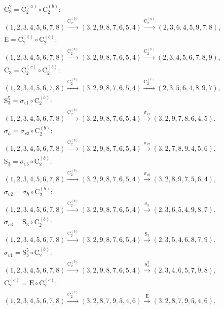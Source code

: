 \begin{align*}
& \mathrm{C}_{3}^{2} = \mathrm{C}_{2}^{(a)} \circ \mathrm{C}_{2}^{(b)}:\; \\& (1,2,3,4,5,6,7,8) \xrightarrow{\mathrm{C}_{2}^{(b)}} (3,2,9,8,7,6,5,4) \xrightarrow{\mathrm{C}_{2}^{(a)}} (2,3,6,4,5,9,7,8), \\
& \mathrm{E} = \mathrm{C}_{2}^{(b)} \circ \mathrm{C}_{2}^{(b)}:\; \\& (1,2,3,4,5,6,7,8) \xrightarrow{\mathrm{C}_{2}^{(b)}} (3,2,9,8,7,6,5,4) \xrightarrow{\mathrm{C}_{2}^{(b)}} (2,3,4,5,6,7,8,9), \\
& \mathrm{C}_{3} = \mathrm{C}_{2}^{(c)} \circ \mathrm{C}_{2}^{(b)}:\; \\& (1,2,3,4,5,6,7,8) \xrightarrow{\mathrm{C}_{2}^{(b)}} (3,2,9,8,7,6,5,4) \xrightarrow{\mathrm{C}_{2}^{(c)}} (2,3,5,6,4,8,9,7), \\
& \mathrm{S}_{3}^{5} = \sigma_{v1} \circ \mathrm{C}_{2}^{(b)}:\; \\& (1,2,3,4,5,6,7,8) \xrightarrow{\mathrm{C}_{2}^{(b)}} (3,2,9,8,7,6,5,4) \xrightarrow{\sigma_{v1}} (3,2,9,7,8,6,4,5), \\
& \sigma_{h} = \sigma_{v2} \circ \mathrm{C}_{2}^{(b)}:\; \\& (1,2,3,4,5,6,7,8) \xrightarrow{\mathrm{C}_{2}^{(b)}} (3,2,9,8,7,6,5,4) \xrightarrow{\sigma_{v2}} (3,2,7,8,9,4,5,6), \\
& \mathrm{S}_{3} = \sigma_{v3} \circ \mathrm{C}_{2}^{(b)}:\; \\& (1,2,3,4,5,6,7,8) \xrightarrow{\mathrm{C}_{2}^{(b)}} (3,2,9,8,7,6,5,4) \xrightarrow{\sigma_{v3}} (3,2,8,9,7,5,6,4), \\
& \sigma_{v2} = \sigma_{h} \circ \mathrm{C}_{2}^{(b)}:\; \\& (1,2,3,4,5,6,7,8) \xrightarrow{\mathrm{C}_{2}^{(b)}} (3,2,9,8,7,6,5,4) \xrightarrow{\sigma_{h}} (2,3,6,5,4,9,8,7), \\
& \sigma_{v3} = \mathrm{S}_{3} \circ \mathrm{C}_{2}^{(b)}:\; \\& (1,2,3,4,5,6,7,8) \xrightarrow{\mathrm{C}_{2}^{(b)}} (3,2,9,8,7,6,5,4) \xrightarrow{\mathrm{S}_{3}} (2,3,5,4,6,8,7,9), \\
& \sigma_{v1} = \mathrm{S}_{3}^{5} \circ \mathrm{C}_{2}^{(b)}:\; \\& (1,2,3,4,5,6,7,8) \xrightarrow{\mathrm{C}_{2}^{(b)}} (3,2,9,8,7,6,5,4) \xrightarrow{\mathrm{S}_{3}^{5}} (2,3,4,6,5,7,9,8), \\
& \mathrm{C}_{2}^{(c)} = \mathrm{E} \circ \mathrm{C}_{2}^{(c)}:\; \\& (1,2,3,4,5,6,7,8) \xrightarrow{\mathrm{C}_{2}^{(c)}} (3,2,8,7,9,5,4,6) \xrightarrow{\mathrm{E}} (3,2,8,7,9,5,4,6), \\

\end{align*}
